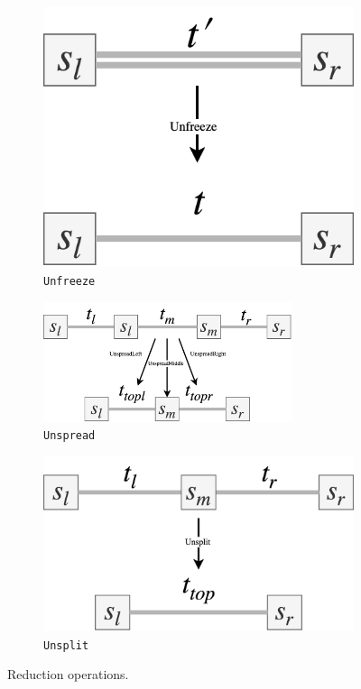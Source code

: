 \documentclass[12pt,a4paper,twoside,openright]{report}
\theoremstyle{definition}
\begin{document}
\begin{figure}[h]
  \centering
  \begin{subfigure}[t]{.2\textwidth}
    \centering\includegraphics[keepaspectratio,width=\textwidth]{impl/eval/unfreeze}
    \caption{\texttt{Unfreeze}}
    \label{fig:splitOp}
  \end{subfigure}
  \begin{subfigure}[t]{.43\textwidth}
    \centering\includegraphics[keepaspectratio,width=0.8\textwidth]{impl/eval/unspread}
    \caption{\texttt{Unspread}}
    \label{fig:spreadOP}
  \end{subfigure}
  \begin{subfigure}[t]{.3\textwidth}
    \centering\includegraphics[keepaspectratio,width=\textwidth]{impl/eval/unsplit}
    \caption{\texttt{Unsplit}}
    \label{fig:freezeOp}
  \end{subfigure}

  \captionsetup{width=.9\linewidth}
  \caption{Reduction operations.}
  \label{fig:evalOps}
\end{figure}
\end{document}
